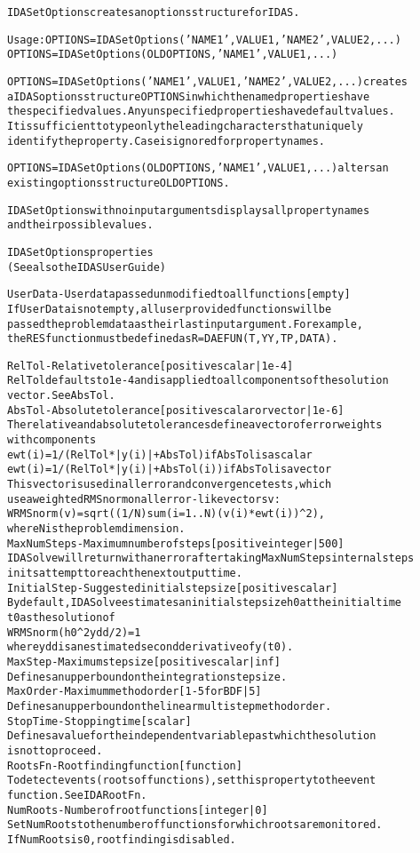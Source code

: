 \begin{alltt}
IDASetOptions creates an options structure for IDAS.

   Usage: OPTIONS = IDASetOptions('NAME1',VALUE1,'NAME2',VALUE2,...)
          OPTIONS = IDASetOptions(OLDOPTIONS,'NAME1',VALUE1,...)

   OPTIONS = IDASetOptions('NAME1',VALUE1,'NAME2',VALUE2,...) creates 
   a IDAS options structure OPTIONS in which the named properties have 
   the specified values. Any unspecified properties have default values. 
   It is sufficient to type only the leading characters that uniquely 
   identify the property. Case is ignored for property names. 
   
   OPTIONS = IDASetOptions(OLDOPTIONS,'NAME1',VALUE1,...) alters an 
   existing options structure OLDOPTIONS.
   
   IDASetOptions with no input arguments displays all property names 
   and their possible values.
   
IDASetOptions properties
(See also the IDAS User Guide)

UserData - User data passed unmodified to all functions [ empty ]
   If UserData is not empty, all user provided functions will be
   passed the problem data as their last input argument. For example,
   the RES function must be defined as R = DAEFUN(T,YY,TP,DATA).

RelTol - Relative tolerance [ positive scalar | {1e-4} ]
   RelTol defaults to 1e-4 and is applied to all components of the solution
   vector. See AbsTol.
AbsTol - Absolute tolerance [ positive scalar or vector | {1e-6} ]
   The relative and absolute tolerances define a vector of error weights
   with components
     ewt(i) = 1/(RelTol*|y(i)| + AbsTol)    if AbsTol is a scalar
     ewt(i) = 1/(RelTol*|y(i)| + AbsTol(i)) if AbsTol is a vector
   This vector is used in all error and convergence tests, which
   use a weighted RMS norm on all error-like vectors v:
     WRMSnorm(v) = sqrt( (1/N) sum(i=1..N) (v(i)*ewt(i))^2 ),
   where N is the problem dimension.
MaxNumSteps - Maximum number of steps [positive integer | {500}]
   IDASolve will return with an error after taking MaxNumSteps internal steps
   in its attempt to reach the next output time.
InitialStep - Suggested initial stepsize [ positive scalar ]
   By default, IDASolve estimates an initial stepsize h0 at the initial time
   t0 as the solution of
     WRMSnorm(h0^2 ydd / 2) = 1
   where ydd is an estimated second derivative of y(t0).
MaxStep - Maximum stepsize [ positive scalar | {inf} ]
   Defines an upper bound on the integration step size.
MaxOrder - Maximum method order [ 1-5 for BDF | {5} ]
   Defines an upper bound on the linear multistep method order.
StopTime - Stopping time [ scalar ]
   Defines a value for the independent variable past which the solution
   is not to proceed.
RootsFn - Rootfinding function [ function ]
   To detect events (roots of functions), set this property to the event
   function. See IDARootFn.
NumRoots - Number of root functions [ integer | {0} ]
   Set NumRoots to the number of functions for which roots are monitored.
   If NumRoots is 0, rootfinding is disabled.


\end{alltt}
